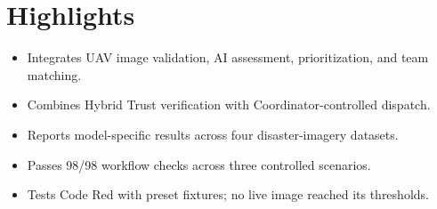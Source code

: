 \documentclass[pdflatex,sn-mathphys-ay]{sn-jnl}
\begin{document}

\maketitle

\section*{Highlights}
\begin{itemize}
    \item Integrates UAV image validation, AI assessment, prioritization, and team matching.
    \item Combines Hybrid Trust verification with Coordinator-controlled dispatch.
    \item Reports model-specific results across four disaster-imagery datasets.
    \item Passes 98/98 workflow checks across three controlled scenarios.
    \item Tests Code Red with preset fixtures; no live image reached its thresholds.
\end{itemize}
\clearpage
{}
\end{document}
